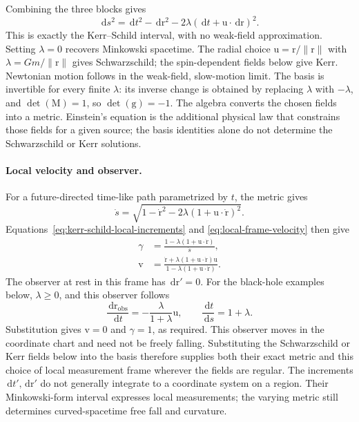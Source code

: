 \documentclass[11pt]{article}
\newcommand{\vstyle}[1]{{\bm{\mathrm{#1}}}}
\numberwithin{equation}{section}
\newcommand{\dotprod}{\cdot}
\newcommand{\br}{\vstyle{r}}
\newcommand{\bv}{\vstyle{v}}
\newcommand{\bu}{\vstyle{u}}
\newcommand{\bg}{\vstyle{g}}
\newcommand{\bM}{\vstyle{M}}
\newcommand{\dd}{\,\mathrm d}
\begin{document}
Combining the three blocks gives
\begin{equation}
 \boxed{\dd s^2=\dd t^2-\dd\br^2
       -2\lambda(\dd t+\bu\dotprod\dd\br)^2.}
 \label{eq:kerr-schild-interval}
\end{equation}
This is exactly the Kerr--Schild interval, with no weak-field
approximation. Setting $\lambda=0$ recovers Minkowski spacetime.
The radial choice $\bu=\br/\lVert\br\rVert$ with
$\lambda=Gm/\lVert\br\rVert$ gives Schwarzschild; the spin-dependent
fields below give Kerr. Newtonian motion follows in the weak-field,
slow-motion limit.
The basis is invertible for every finite $\lambda$: its inverse change
is obtained by replacing $\lambda$ with $-\lambda$, and
$\det(\bM)=1$, so $\det(\bg)=-1$.
The algebra converts the chosen fields into a metric. Einstein's equation
is the additional physical law that constrains those fields for a given
source; the basis identities alone do not determine the Schwarzschild
or Kerr solutions.

\paragraph{Local velocity and observer.}
For a future-directed time-like path parametrized by $t$, the metric gives
\begin{equation}
 \dot s=\sqrt{1-\dot\br^2-2\lambda(1+\bu\dotprod\dot\br)^2}.
 \label{eq:kerr-schild-clock}
\end{equation}
Equations~\eqref{eq:kerr-schild-local-increments} and
\eqref{eq:local-frame-velocity} then give
\begin{equation}
 \boxed{\begin{aligned}
 \gamma&=\frac{1-\lambda(1+\bu\dotprod\dot\br)}{\dot s},\\
 \bv&=\frac{\dot\br+\lambda(1+\bu\dotprod\dot\br)\bu}
               {1-\lambda(1+\bu\dotprod\dot\br)}.
 \end{aligned}}
 \label{eq:kerr-schild-local-velocity}
\end{equation}
The observer at rest in this frame has $\dd\br'=\vstyle{0}$. For the
black-hole examples below, $\lambda\geq0$, and this observer follows
\[
 \frac{\dd\br_{\mathrm{obs}}}{\dd t}
 =-\frac{\lambda}{1+\lambda}\bu,\qquad
 \frac{\dd t}{\dd s}=1+\lambda.
\]
Substitution gives $\bv=\vstyle{0}$ and $\gamma=1$, as required.
This observer moves in the coordinate chart and need not be freely falling.
Substituting the Schwarzschild or Kerr fields below into the basis
therefore supplies both their exact metric and this choice of local
measurement frame wherever the fields are regular. The increments
$\dd t',\dd\br'$ do not generally integrate to a coordinate system on a
region. Their Minkowski-form interval expresses local measurements;
the varying metric still determines curved-spacetime free fall and curvature.
\end{document}
